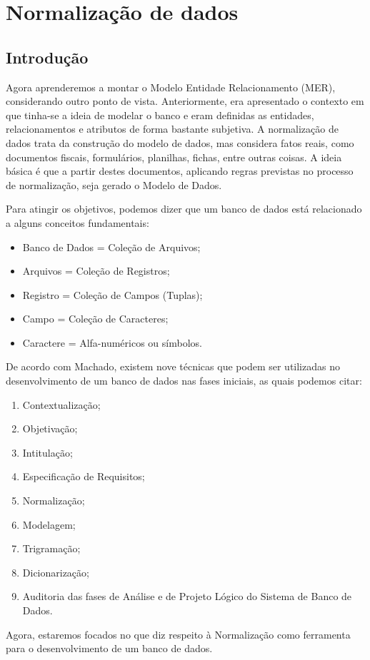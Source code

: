 \documentclass{article}
\begin{document}
\section{Normalização de dados}
\subsection{Introdução}
Agora aprenderemos a montar o Modelo Entidade Relacionamento (MER), considerando outro ponto de vista. Anteriormente, era apresentado o contexto em que tinha-se a ideia de modelar o banco e eram definidas as entidades, relacionamentos e atributos de forma bastante subjetiva. A normalização de dados trata da construção do modelo de dados, mas considera fatos reais, como documentos fiscais, formulários, planilhas, fichas, entre outras coisas. A ideia básica é que a partir destes documentos, aplicando regras previstas no processo de normalização, seja gerado o Modelo de Dados.

Para atingir os objetivos, podemos dizer que um banco de dados está relacionado a alguns conceitos fundamentais:

\begin{itemize}
    \item Banco de Dados = Coleção de Arquivos;
    \item Arquivos = Coleção de Registros;
    \item Registro = Coleção de Campos (Tuplas);
    \item Campo = Coleção de Caracteres;
    \item Caractere = Alfa-numéricos ou símbolos. 
\end{itemize}

De acordo com Machado, existem nove técnicas que podem ser utilizadas no desenvolvimento de um banco de dados nas fases iniciais, as quais podemos citar: 

\begin{enumerate}
    \item Contextualização;
    \item Objetivação;
    \item Intitulação;
    \item Especificação de Requisitos;
    \item Normalização;
    \item Modelagem;
    \item Trigramação;
    \item Dicionarização;
    \item Auditoria das fases de Análise e de Projeto Lógico do Sistema de Banco de Dados.
\end{enumerate}
Agora, estaremos focados no que diz respeito à Normalização como ferramenta para o desenvolvimento de um banco de dados.
\end{document}
